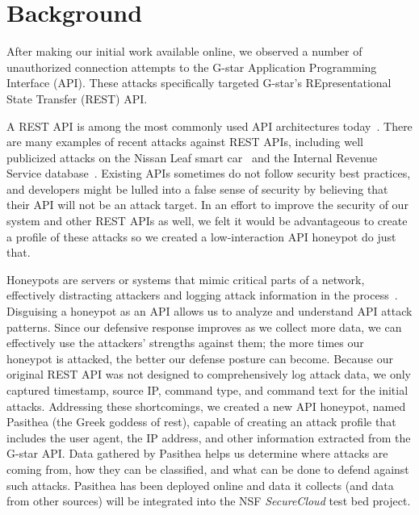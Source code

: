 
\section{Background} \label{background}

After making our initial work available online, we observed a number of unauthorized connection attempts to the G-star Application Programming Interface (API).  
These attacks specifically targeted G-star's REpresentational State Transfer (REST) API.

A REST API is among the most commonly used API architectures today~\cite{REST-API-use}.
There are many examples of recent attacks against REST APIs, including well publicized attacks on the Nissan Leaf smart car~\cite{Nissan-Leaf} and the Internal Revenue Service database~\cite{IRS}.  
Existing APIs sometimes do not follow security best practices, and developers might be lulled into a false sense of security by believing that their API will not be an attack target.  
In an effort to improve the security of our system and other REST APIs as well, we felt it would be advantageous to create a profile of these attacks so we created a low-interaction API honeypot do just that.

Honeypots are servers or systems that mimic critical parts of a network, effectively distracting attackers and logging attack information in the process~\cite{honeypot-Def}.
Disguising a honeypot as an API allows us to analyze and understand API attack patterns.
Since our defensive response improves as we collect more data, we can effectively use the attackers' strengths against them; the more times our honeypot is attacked, the better our defense posture can become.  
Because our original REST API was not designed to comprehensively log attack data, we only captured timestamp, source IP, command type, and command text for the initial attacks.  
Addressing these shortcomings, we created a new API honeypot, named Pasithea (the Greek goddess of rest), capable of creating an attack profile that includes the user agent, the IP address, and other information extracted from the G-star API.
Data gathered by Pasithea helps us determine where attacks are coming from, how they can be classified, and what can be done to defend against such attacks.  
Pasithea has been deployed online and data it collects (and data from other sources) will be integrated into the NSF {\em SecureCloud} test bed project.  

